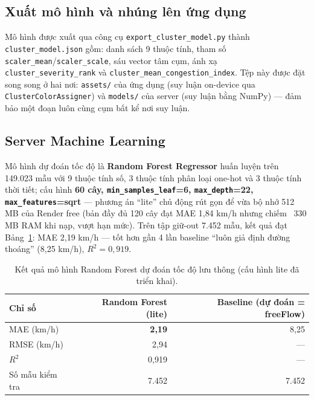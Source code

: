 \subsection{Xuất mô hình và nhúng lên ứng dụng}
Mô hình được xuất qua công cụ \texttt{export\_cluster\_model.py} thành \texttt{cluster\_model.json} gồm: danh sách 9 thuộc tính, tham số \texttt{scaler\_mean}/\texttt{scaler\_scale}, sáu vector tâm cụm, ánh xạ \texttt{cluster\_severity\_rank} và \texttt{cluster\_mean\_congestion\_index}. Tệp này được đặt song song ở hai nơi: \texttt{assets/} của ứng dụng (suy luận on-device qua \texttt{ClusterColorAssigner}) và \texttt{models/} của server (suy luận bằng NumPy) --- đảm bảo một đoạn luôn cùng cụm bất kể nơi suy luận.

\subsection{Server Machine Learning}
Mô hình dự đoán tốc độ là \textbf{Random Forest Regressor} huấn luyện trên 149.023 mẫu với 9 thuộc tính số, 3 thuộc tính phân loại one-hot và 3 thuộc tính thời tiết; cấu hình \textbf{60 cây, \texttt{min\_samples\_leaf}=6, \texttt{max\_depth}=22, \texttt{max\_features}=sqrt} --- phương án ``lite'' chủ động rút gọn để vừa bộ nhớ 512 MB của Render free (bản đầy đủ 120 cây đạt MAE 1{,}84 km/h nhưng chiếm ~330 MB RAM khi nạp, vượt hạn mức). Trên tập giữ-out 7.452 mẫu, kết quả đạt Bảng~\ref{tab:rf}: MAE 2{,}19 km/h --- tốt hơn gần 4 lần baseline ``luôn giả định đường thoáng'' (8{,}25 km/h), $R^2 = 0{,}919$.

\begin{table}[h!]
\centering
\caption{Kết quả mô hình Random Forest dự đoán tốc độ lưu thông (cấu hình lite đã triển khai).}
\label{tab:rf}
\small
\begin{tabular}{lrr}
\toprule
\textbf{Chỉ số} & \textbf{Random Forest (lite)} & \textbf{Baseline (dự đoán = freeFlow)}\\
\midrule
MAE (km/h) & \textbf{2{,}19} & 8{,}25\\
RMSE (km/h) & 2{,}94 & ---\\
$R^2$ & 0{,}919 & ---\\
Số mẫu kiểm tra & 7.452 & 7.452\\
\bottomrule
\end{tabular}
\end{table}


